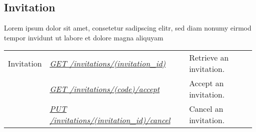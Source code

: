 \documentclass[letterpaper,10pt,english]{sphinxmanual}
\begin{document}
\subsection{Invitation}
\label{\detokenize{resources/invitation::doc}}\label{\detokenize{resources/invitation:invitation}}
Lorem ipsum dolor sit amet, consetetur sadipscing elitr, sed diam nonumy eirmod tempor invidunt ut labore et dolore magna aliquyam

\noindent\begin{tabulary}{\linewidth}{|L|L|L|}
\hline
{}\relax &\relax &\relax \\
\hline
Invitation
&
{\hyperref[\detokenize{resources/invitation:get--invitations-(invitation_id)}]{\emph{GET /invitations/(invitation\_id)}}}
&
Retrieve an invitation.
\\
\hline&
{\hyperref[\detokenize{resources/invitation:get--invitations-(code)-accept}]{\emph{GET /invitations/(code)/accept}}}
&
Accept an invitation.
\\
\hline&
{\hyperref[\detokenize{resources/invitation:put--invitations-(invitation_id)-cancel}]{\emph{PUT /invitations/(invitation\_id)/cancel}}}
&
Cancel an invitation.
\\
\hline\end{tabulary}


\begin{DUlineblock}{0em}
\item[] 
\end{DUlineblock}
\end{document}
